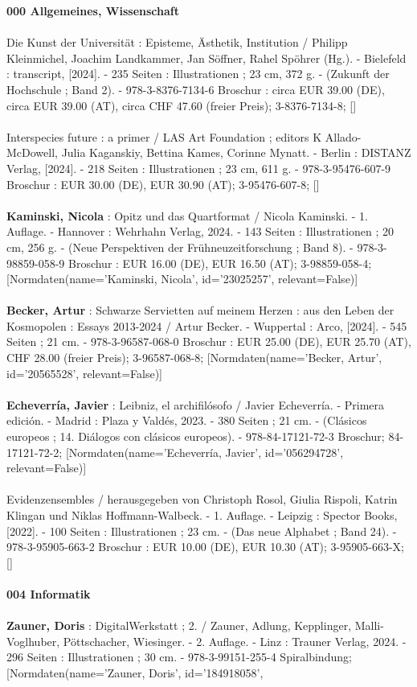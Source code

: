 \documentclass{article}
\begin{document}
\begin{multicols}{3}



\textbf{000 Allgemeines, Wissenschaft}\\\\Die Kunst der Universität : Episteme, Ästhetik, Institution / Philipp Kleinmichel, Joachim Landkammer, Jan Söffner, Rahel Spöhrer (Hg.). - Bielefeld : transcript, [2024]. - 235 Seiten : Illustrationen ; 23 cm, 372 g. - (Zukunft der Hochschule ; Band 2). - 978-3-8376-7134-6 Broschur : circa EUR 39.00 (DE), circa EUR 39.00 (AT), circa CHF 47.60 (freier Preis); 3-8376-7134-8; []\\\\Interspecies future : a primer / LAS Art Foundation ; editors K Allado-McDowell, Julia Kaganskiy, Bettina Kames, Corinne Mynatt. - Berlin : DISTANZ Verlag, [2024]. - 218 Seiten : Illustrationen ; 23 cm, 611 g. - 978-3-95476-607-9 Broschur : EUR 30.00 (DE), EUR 30.90 (AT); 3-95476-607-8; []\\\\\textbf{Kaminski, Nicola} : Opitz und das Quartformat / Nicola Kaminski. - 1. Auflage. - Hannover : Wehrhahn Verlag, 2024. - 143 Seiten : Illustrationen ; 20 cm, 256 g. - (Neue Perspektiven der Frühneuzeitforschung ; Band 8). - 978-3-98859-058-9 Broschur : EUR 16.00 (DE), EUR 16.50 (AT); 3-98859-058-4; [Normdaten(name='Kaminski, Nicola', id='23025257', relevant=False)]\\\\\textbf{Becker, Artur} : Schwarze Servietten auf meinem Herzen : aus den Leben der Kosmopolen : Essays 2013-2024 / Artur Becker. - Wuppertal : Arco, [2024]. - 545 Seiten ; 21 cm. - 978-3-96587-068-0 Broschur : EUR 25.00 (DE), EUR 25.70 (AT), CHF 28.00 (freier Preis); 3-96587-068-8; [Normdaten(name='Becker, Artur', id='20565528', relevant=False)]\\\\\textbf{Echeverría, Javier} : Leibniz, el archifilósofo / Javier Echeverría. - Primera edición. - Madrid : Plaza y Valdés, 2023. - 380 Seiten ; 21 cm. - (Clásicos europeos ; 14. Diálogos con clásicos europeos). - 978-84-17121-72-3 Broschur; 84-17121-72-2; [Normdaten(name='Echeverría, Javier', id='056294728', relevant=False)]\\\\Evidenzensembles / herausgegeben von Christoph Rosol, Giulia Rispoli, Katrin Klingan und Niklas Hoffmann-Walbeck. - 1. Auflage. - Leipzig : Spector Books, [2022]. - 100 Seiten : Illustrationen ; 23 cm. - (Das neue Alphabet ; Band 24). - 978-3-95905-663-2 Broschur : EUR 10.00 (DE), EUR 10.30 (AT); 3-95905-663-X; []\\\\\textbf{004 Informatik}\\\\\textbf{Zauner, Doris} : DigitalWerkstatt ; 2. / Zauner, Adlung, Kepplinger, Malli-Voglhuber, Pöttschacher, Wiesinger. - 2. Auflage. - Linz : Trauner Verlag, 2024. - 296 Seiten : Illustrationen ; 30 cm. - 978-3-99151-255-4 Spiralbindung; [Normdaten(name='Zauner, Doris', id='184918058', 
\end{multicols}
\end{document}
